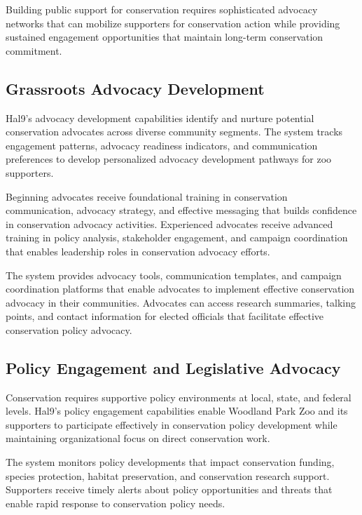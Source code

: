 \documentclass[
  Letterpaper,
]{scrbook}
\begin{document}
Building public support for conservation requires sophisticated advocacy
networks that can mobilize supporters for conservation action while
providing sustained engagement opportunities that maintain long-term
conservation commitment.

\subsection{Grassroots Advocacy
Development}\label{grassroots-advocacy-development}

Hal9's advocacy development capabilities identify and nurture potential
conservation advocates across diverse community segments. The system
tracks engagement patterns, advocacy readiness indicators, and
communication preferences to develop personalized advocacy development
pathways for zoo supporters.

Beginning advocates receive foundational training in conservation
communication, advocacy strategy, and effective messaging that builds
confidence in conservation advocacy activities. Experienced advocates
receive advanced training in policy analysis, stakeholder engagement,
and campaign coordination that enables leadership roles in conservation
advocacy efforts.

The system provides advocacy tools, communication templates, and
campaign coordination platforms that enable advocates to implement
effective conservation advocacy in their communities. Advocates can
access research summaries, talking points, and contact information for
elected officials that facilitate effective conservation policy
advocacy.

\subsection{Policy Engagement and Legislative
Advocacy}\label{policy-engagement-and-legislative-advocacy}

Conservation requires supportive policy environments at local, state,
and federal levels. Hal9's policy engagement capabilities enable
Woodland Park Zoo and its supporters to participate effectively in
conservation policy development while maintaining organizational focus
on direct conservation work.

The system monitors policy developments that impact conservation
funding, species protection, habitat preservation, and conservation
research support. Supporters receive timely alerts about policy
opportunities and threats that enable rapid response to conservation
policy needs.
\end{document}
